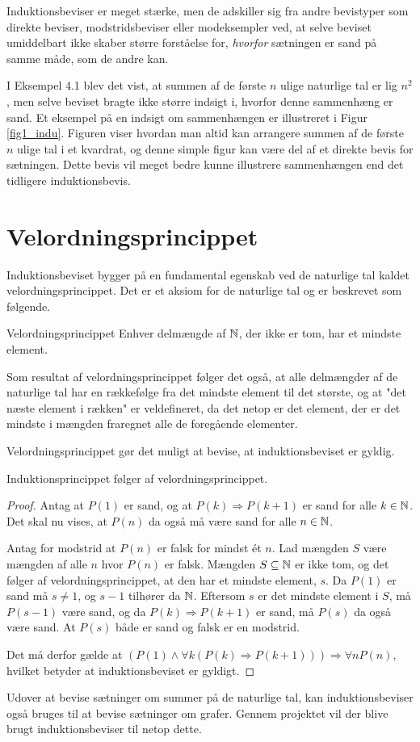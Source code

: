 Induktionsbeviser er meget stærke, men de adskiller sig fra andre bevistyper som direkte beviser, modstridsbeviser eller modeksempler ved, at selve beviset umiddelbart ikke skaber større forståelse for, \textit{hvorfor} sætningen er sand på samme måde, som de andre kan.

I Eksempel 4.1 blev det vist, at summen af de første $n$ ulige naturlige tal er lig $n^2$, men selve beviset bragte ikke større indsigt i, hvorfor denne sammenhæng er sand.
Et eksempel på en indsigt om sammenhængen er illustreret i  Figur \ref{fig1_indu}.
Figuren viser hvordan man altid kan arrangere summen af de første $n$ ulige tal i et kvardrat, og denne simple figur kan være del af et direkte bevis for sætningen.
Dette bevis vil meget bedre kunne illustrere sammenhængen end det tidligere induktionsbevis.

\section{Velordningsprincippet}
Induktionsbeviset bygger på en fundamental egenskab ved de naturlige tal kaldet velordningsprincippet.
Det er et aksiom for de naturlige tal og er beskrevet som følgende.
\begin{theorembox}{Velordningsprincippet}
	Enhver delmængde af $\mathbb{N}$, der ikke er tom, har et mindste element.
\end{theorembox}
\noindent Som resultat af velordningsprincippet følger det også, at alle delmængder af de naturlige tal har en rækkefølge fra det mindste element til det største, og at "det næste element i rækken" er veldefineret, da det netop er det element, der er det mindste i mængden fraregnet alle de foregående elementer.

Velordningsprincippet gør det muligt at bevise, at induktionsbeviset er gyldig.

\begin{thm}
	Induktionsprincippet følger af velordningsprincippet.
\end{thm}

\begin{proof}
	Antag at $P(1)$ er sand, og at $P(k) \Rightarrow P(k + 1)$ er sand for alle $k \in \mathbb{N}$.
	Det skal nu vises, at $P(n)$ da også må være sand for alle $n \in \mathbb{N}$.

	Antag for modstrid at $P(n)$ er falsk for mindst ét $n$.
	Lad mængden $S$ være mængden af alle $n$ hvor $P(n)$ er falsk.
	Mængden $S \subseteq \mathbb{N}$ er ikke tom, og det følger af velordningsprincippet, at den har et mindste element, $s$.
	Da $P(1)$ er sand må $s \neq 1$, og $s - 1$ tilhører da $\mathbb{N}$.
	Eftersom $s$ er det mindste element i $S$, må $P(s - 1)$ være sand, og da $P(k) \Rightarrow P(k+1)$ er sand, må $P(s)$ da også være sand.
	At $P(s)$ både er sand og falsk er en modstrid.

	Det må derfor gælde at $(P(1) \land \forall k ( P(k) \Rightarrow P(k + 1))) \Rightarrow \forall n P(n)$, hvilket betyder at induktionsbeviset er gyldigt.
\end{proof}

Udover at bevise sætninger om summer på de naturlige tal, kan induktionsbeviser også bruges til at bevise sætninger om grafer.
Gennem projektet vil der blive brugt induktionsbeviser til netop dette.
